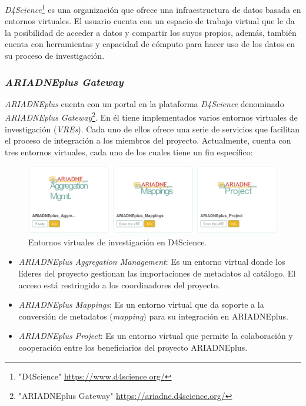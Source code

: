 \documentclass[
]{article}
\providecommand{\tightlist}{%
  \setlength{\itemsep}{0pt}\setlength{\parskip}{0pt}}
\begin{document}
\emph{D4Science}\footnote{"D4Science" \url{https://www.d4science.org/}}
es una organización que ofrece una infraestructura de datos basada en
entornos virtuales. El usuario cuenta con un espacio de trabajo virtual
que le da la posibilidad de acceder a datos y compartir los suyos
propios, además, también cuenta con herramientas y capacidad de cómputo
para hacer uso de los datos en su proceso de investigación.

\hypertarget{ariadneplus-gateway}{%
\subsubsection{\texorpdfstring{\emph{ARIADNEplus
Gateway}}{ARIADNEplus Gateway}}\label{ariadneplus-gateway}}

\emph{ARIADNEplus} cuenta con un portal en la plataforma
\emph{D4Science} denominado \emph{ARIADNEplus Gateway}\footnote{"ARIADNEplus
  Gateway" \url{https://ariadne.d4science.org/}}. En él tiene
implementados varios entornos virtuales de investigación (\emph{VREs}).
Cada uno de ellos ofrece una serie de servicios que facilitan el proceso
de integración a los miembros del proyecto. Actualmente, cuenta con tres
entornos virtuales, cada uno de los cuales tiene un fin específico:

\begin{figure}
\hypertarget{d4scienceVREs}{%
\centering
\includegraphics{../_static/images/d4scienceVREs.png}
\caption{Entornos virtuales de investigación en
D4Science.}\label{d4scienceVREs}
}
\end{figure}

\begin{itemize}
\tightlist
\item
  \emph{ARIADNEplus Aggregation Management}: Es un entorno virtual donde
  los líderes del proyecto gestionan las importaciones de metadatos al
  catálogo. El acceso está restringido a los coordinadores del proyecto.
\item
  \emph{ARIADNEplus Mappings}: Es un entorno virtual que da soporte a la
  conversión de metadatos (\emph{mapping}) para su integración en
  ARIADNEplus.
\item
  \emph{ARIADNEplus Project}: Es un entorno virtual que permite la
  colaboración y cooperación entre los beneficiarios del proyecto
  ARIADNEplus.
\end{itemize}
\end{document}

